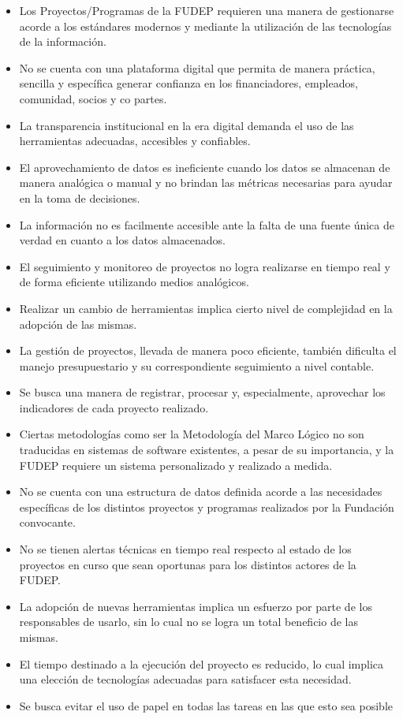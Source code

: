 \begin{itemize}
    \item Los Proyectos/Programas de la FUDEP requieren una manera de gestionarse acorde a los estándares modernos y mediante la utilización de las tecnologías de la información.
    \item No se cuenta con una plataforma digital que permita de manera práctica, sencilla y específica generar confianza en los financiadores, empleados, comunidad, socios y co partes.
    \item La transparencia institucional en la era digital demanda el uso de las herramientas adecuadas, accesibles y confiables.
    \item El aprovechamiento de datos es ineficiente cuando los datos se almacenan de manera analógica o manual y no brindan las métricas necesarias para ayudar en la toma de decisiones.
    \item La información no es facilmente accesible ante la falta de una fuente única de verdad en cuanto a los datos almacenados.
    \item El seguimiento y monitoreo de proyectos no logra realizarse en tiempo real y de forma eficiente utilizando medios analógicos.
    \item Realizar un cambio de herramientas implica cierto nivel de complejidad en la adopción de las mismas.
    \item La gestión de proyectos, llevada de manera poco eficiente, también dificulta el manejo presupuestario y su correspondiente seguimiento a nivel contable.
    \item Se busca una manera de registrar, procesar y, especialmente, aprovechar los indicadores de cada proyecto realizado.
    \item Ciertas metodologías como ser la Metodología del Marco Lógico no son traducidas en sistemas de software existentes, a pesar de su importancia, y la FUDEP requiere un sistema personalizado y realizado a medida.
    \item No se cuenta con una estructura de datos definida acorde a las necesidades específicas de los distintos proyectos y programas realizados por la Fundación convocante.
    \item No se tienen alertas técnicas en tiempo real respecto al estado de los proyectos en curso que sean oportunas para los distintos actores de la FUDEP.
    \item La adopción de nuevas herramientas implica un esfuerzo por parte de los responsables de usarlo, sin lo cual no se logra un total beneficio de las mismas.
    \item El tiempo destinado a la ejecución del proyecto es reducido, lo cual implica una elección de tecnologías adecuadas para satisfacer esta necesidad.
    \item Se busca evitar el uso de papel en todas las tareas en las que esto sea posible
\end{itemize}